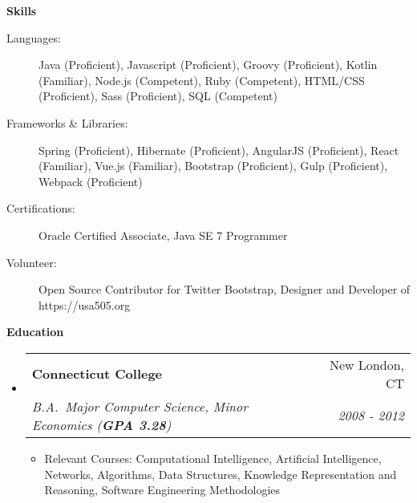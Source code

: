 \documentclass[letterpaper,11pt]{article}
\makeatletter
\newcommand{\resitem}[1]{\item #1 \vspace{-2pt}}
\newcommand{\resheading}[1]{{\large \colorbox{mygrey}{\begin{minipage}{\textwidth}{\textbf{#1 \vphantom{p\^{E}}}}\end{minipage}}}}
\newcommand{\ressubheading}[4]{
    \begin{tabular*}{7.0in}{l@{\extracolsep{\fill}}r}
        \textbf{#1} & #2 \\
        \textit{#3} & \textit{#4} \\
    \end{tabular*}\vspace{-6pt}}
\makeatother
\begin{document}
    \resheading{Skills}
    \begin{description}
        \item[Languages:]
        Java (Proficient), Javascript (Proficient), Groovy (Proficient), Kotlin (Familiar), Node.js (Competent), Ruby (Competent), HTML/CSS (Proficient), Sass (Proficient), SQL (Competent)
        \item[Frameworks \& Libraries:]
        Spring (Proficient), Hibernate (Proficient), AngularJS (Proficient), React (Familiar), Vue.js (Familiar), Bootstrap (Proficient), Gulp (Proficient), Webpack (Proficient)
        \item[Certifications:]
        Oracle Certified Associate, Java SE 7 Programmer
        \item[Volunteer:]
        Open Source Contributor for Twitter Bootstrap, Designer and Developer of https://usa505.org
    \end{description}

    \resheading{Education}
    \begin{itemize}
        \item
        \ressubheading{Connecticut College}{New London, CT}{B.A.\ Major Computer Science, Minor Economics (\textbf{GPA 3.28})}{2008 - 2012}
        \begin{itemize}
            \resitem{Relevant Courses: Computational Intelligence, Artificial Intelligence, Networks, Algorithms, Data Structures, Knowledge Representation and Reasoning, Software Engineering Methodologies}
        \end{itemize}
    \end{itemize}
\end{document}
